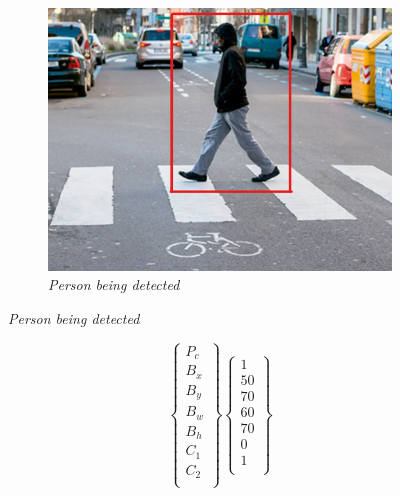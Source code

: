 \begin{figure}[H]
    \centering
    \begin{subfigure}[b]{0.6\textwidth}
        \centering
        \includegraphics[width=\textwidth]{Figures/2. Related Work/person_detected.png}
        \caption{\textit{
                Person being detected
            }}
    \end{subfigure}
\end{figure}


\begin{equation}
    \left\{
    \begin{array}{ll}
        P_{c} \\
        B_{x} \\
        B_{y} \\
        B_{w} \\
        B_{h} \\
        C_{1} \\
        C_{2} \\
    \end{array}
    \right\}
    \left\{
    \begin{array}{ll}
        1  \\
        50 \\
        70 \\
        60 \\
        70 \\
        0  \\
        1  \\
    \end{array}
    \right\}
\end{equation}

